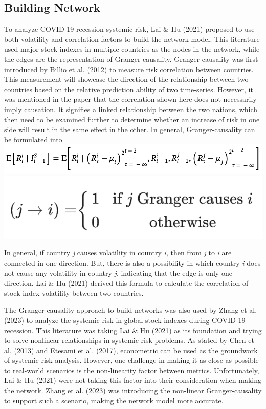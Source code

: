 \documentclass[a4paper,11pt]{article}
\begin{document}
\subsection{Building Network}
To analyze COVID-19 recession systemic risk, Lai \& Hu (2021) proposed to use both volatility and correlation factors to build the network model. This literature used major stock indexes in multiple countries as the nodes in the network, while the edges are the representation of Granger-causality. Granger-causality was first introduced by Billio et al. (2012) to measure risk correlation between countries. This measurement will showcase the direction of the relationship between two countries based on the relative prediction ability of two time-series. However, it was mentioned in the paper that the correlation shown here does not necessarily imply causation. It signifies a linked relationship between the two nations, which then need to be examined further to determine whether an increase of risk in one side will result in the same effect in the other. In general, Granger-causality can be formulated into
\includegraphics[scale=0.5]{granger_causality_1.png}
\includegraphics[scale=0.5]{granger_causality_2.png}

In general, if country \textit{j} causes volatility in country \textit{i}, then from \textit{j} to \textit{i} are connected in one direction. But, there is also a possibility in which country \textit{i} does not cause any volatility in country \textit{j}, indicating that the edge is only one direction. Lai \& Hu (2021) derived this formula to calculate the correlation of stock index volatility between two countries.

The Granger-causality approach to build networks was also used by Zhang et al. (2023) to analyze the systemic risk in global stock indexes during COVID-19 recession. This literature was taking Lai \& Hu (2021) as its foundation and trying to solve nonlinear relationships in systemic risk problems. As stated by Chen et al. (2013) and Etesami et al. (2017), econometric can be used as the groundwork of systemic risk analysis. However, one challenge in making it as close as possible to real-world scenarios is the non-linearity factor between metrics. Unfortunately, Lai \& Hu (2021) were not taking this factor into their consideration when making the network. Zhang et al. (2023) was introducing the non-linear Granger-causality to support such a scenario, making the network model more accurate. 
\end{document}
